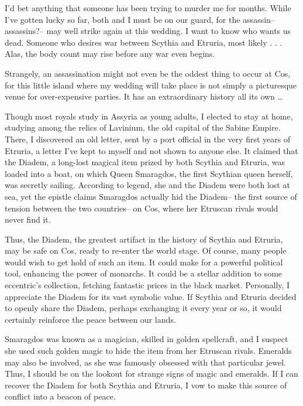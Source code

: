 \documentclass[char]{Kos}
\begin{document}
I'd bet anything that someone has been trying to murder me for months. While I've gotten lucky so far, both \cBride{} and I must be on our guard, for the assassin-- assassins?-- may well strike again at this wedding. I want to know who wants us dead. Someone who desires war between Scythia and Etruria, most likely . . . Alas, the body count may rise before any war even begins. 

Strangely, an assassination might not even be the oddest thing to occur at Cos, for this little island where my wedding will take place is not simply a picturesque venue for over-expensive parties. It has an extraordinary history all its own \ldots

Though most royals study in Assyria as young adults, I elected to stay at home, studying among the relics of Lavinium, the old capital of the Sabine Empire. There, I discovered an old letter, sent by a port official in the very first years of Etruria, a letter I've kept to myself and not shown to anyone else. It claimed that the Diadem, a long-lost magical item prized by both Scythia and Etruria, was loaded into a boat, on which Queen Smaragdos, the first Scythian queen herself, was secretly sailing. According to legend, she and the Diadem were both lost at sea, yet the epistle claims Smaragdos actually hid the Diadem-- the first source of tension between the two countries-- on Cos, where her Etruscan rivals would never find it.

Thus, the Diadem, the greatest artifact in the history of Scythia and Etruria, may be safe on Cos, ready to re-enter the world stage. Of course, many people would wish to get hold of such an item. It could make for a powerful political tool, enhancing the power of monarchs. It could be a stellar addition to some eccentric's collection, fetching fantastic prices in the black market. Personally, I appreciate the Diadem for its vast symbolic value. If Scythia and Etruria decided to openly share the Diadem, perhaps exchanging it every year or so, it would certainly reinforce the peace between our lands.

Smaragdos was known as a magician, skilled in golden spellcraft, and I suspect she used such golden magic to hide the item from her Etruscan rivals. Emeralds may also be involved, as she was famously obsessed with that particular jewel. Thus, I should be on the lookout for strange signs of magic and emeralds. If I can recover the Diadem for both Scythia and Etruria, I vow to make this source of conflict into a beacon of peace. 
\end{document}
